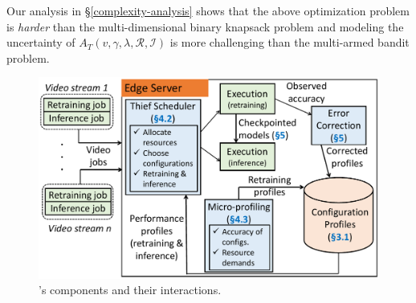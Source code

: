
Our analysis in \S\ref{complexity-analysis} shows that the above optimization problem is {\em harder} than the multi-dimensional binary knapsack problem and modeling the uncertainty of $A_T(v, \gamma, \lambda, \mathcal{R}, \mathcal{I})$ is more challenging than the multi-armed bandit problem.


\begin{figure}[ht]
    \centering
    \includegraphics[width=.85\columnwidth]{ekya/figures/overview_cropped.pdf}
    \caption{{\name}'s components and their interactions. }%
    \label{fig:sys-arch}
\end{figure}

